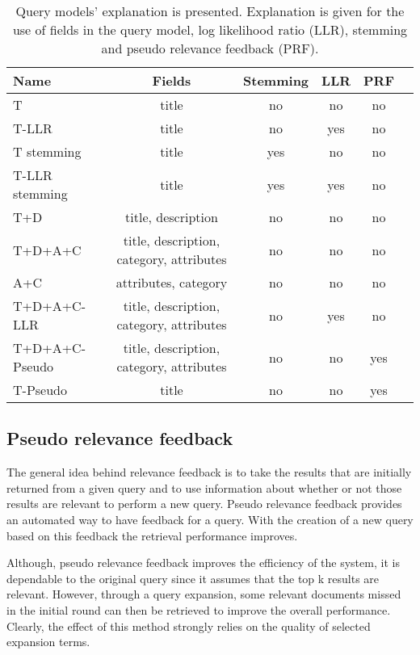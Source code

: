 \begin{table}[H]
\begin{center}
\scriptsize
\caption{Query models' explanation is presented. Explanation is given for the use of fields in the query model, log likelihood ratio (LLR), stemming and pseudo relevance feedback (PRF).}
\label{table:QueryFields}
\begin{tabular}{lccccr}
\midrule
Name & Fields & Stemming & LLR & PRF \\
\midrule
T & title & no & no & no \\
T-LLR & title & no & yes & no \\
T stemming & title & yes & no & no \\
T-LLR stemming & title & yes & yes & no \\
T+D  & title, description & no & no & no \\
T+D+A+C & title, description, category, attributes & no & no & no \\
A+C & attributes, category & no & no & no \\
T+D+A+C-LLR & title, description, category, attributes & no & yes & no \\
T+D+A+C-Pseudo & title, description, category, attributes & no & no & yes \\
T-Pseudo & title & no & no & yes\\
\bottomrule
\end{tabular}
\end{center}
\end{table}

\subsection{Pseudo relevance feedback}

The general idea behind relevance feedback is to take the results that are initially returned from a given query and to use information about whether or not those results are relevant to perform a new query. Pseudo relevance feedback provides an automated way to have feedback for a query. With the creation of a new query based on this feedback the retrieval performance improves.

Although, pseudo relevance feedback improves the efficiency of the system, it is dependable to the original query since it assumes that the top k results are relevant. However, through a query expansion, some relevant documents missed in the initial round can then be retrieved to improve the overall performance. Clearly, the effect of this method strongly relies on the quality of selected expansion terms.

